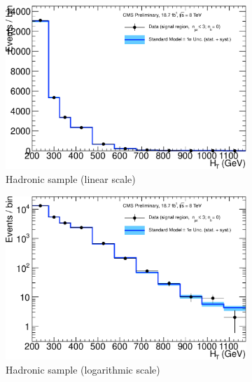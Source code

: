 \clearpage
\begin{figure}[h!]
  \centering
  \begin{subfigure}[b]{0.48\textwidth}
    \includegraphics[width=\textwidth]
    {Figs/results/v0/blueBand/single_plots/hadronic_0b_le3j.pdf}
    \caption{Hadronic sample (linear scale)}
  \end{subfigure}
  \vspace{0.7cm}\begin{subfigure}[b]{0.48\textwidth}
    \includegraphics[width=\textwidth]
    {Figs/results/v0/blueBand/single_plots/hadronic_0b_le3j_logy.pdf}
    \caption{Hadronic sample (logarithmic scale)}
  \end{subfigure}
  \begin{subfigure}[b]{0.48\textwidth}

\end{subfigure}
\end{figure}
